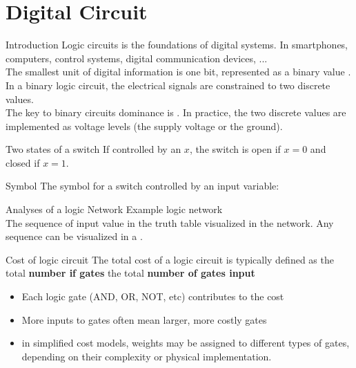 \chapter{Digital Circuit}
    
\begin{parag}{Introduction}
    Logic circuits is the foundations of digital systems. In smartphones, computers, control systems, digital communication devices, ...\\
    The smallest unit of digital information is one bit, represented as a binary value . \\
    In a binary logic circuit, the electrical signals are constrained to two discrete values. \\
    The key to binary circuits dominance is . In practice, the two discrete values are implemented as voltage levels (the supply voltage or the ground).
\end{parag}

\begin{parag}{Two states of a switch}
    If controlled by an  $x$, the switch is open if $x = 0$ and closed if $x = 1$.
\end{parag}

\begin{parag}{Symbol}
    The symbol for a switch controlled by an input variable:
\end{parag}

\begin{parag}{Analyses of a logic Network}
    Example logic network \\
    The sequence of input value in the truth table visualized in the network. Any sequence can be visualized in a .
\end{parag}

\begin{parag}{Cost of logic circuit}
    The total cost of a logic circuit is typically defined as the total \textbf{number if gates}  the total \textbf{number of gates input}
    \begin{itemize}
        \item Each logic gate (AND, OR, NOT, etc) contributes to the cost
        \item More inputs to gates often mean larger, more costly gates
        \item in simplified cost models, weights may be assigned to different types of gates, depending on their complexity or physical implementation.
    \end{itemize}

\end{parag}

